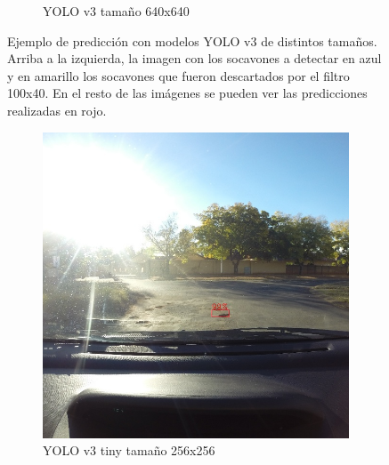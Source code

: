 \begin{figure}[H]
\begin{subfigure}[h]{0.45\linewidth}
		\caption{YOLO v3 tamaño 640x640}
	\end{subfigure}
	\caption{Ejemplo de predicción con modelos YOLO v3 de distintos tamaños. Arriba a la izquierda, la imagen con los socavones a detectar en azul y en amarillo los socavones que fueron descartados por el filtro 100x40. En el resto de las imágenes se pueden ver las predicciones realizadas en rojo.}
	\label{fig:resultsbv3}
\end{figure}

\begin{figure}[H]
	\centering
	\begin{subfigure}[h]{0.45\linewidth}
		\includegraphics[width=\linewidth]{images/results_b_yolo_v3_tiny_256.jpg}
		\caption{YOLO v3 tiny tamaño 256x256}
	\end{subfigure}
	\begin{subfigure}[h]{0.45\linewidth}

\end{subfigure}
\end{figure}
